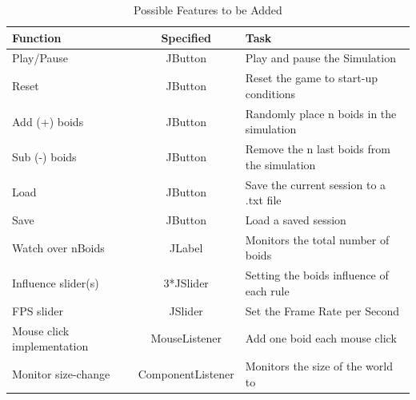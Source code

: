 \documentclass[a4paper,twoside, 10pt]{report}
\begin{document}
\begin{table}[h]
\centering
  \begin{tabular}{l|c|l}
    Function 		& Specified & Task	\\\hline
    Play/Pause 		& JButton & Play and pause the Simulation	\\
    Reset 			& JButton & Reset the game to start-up conditions		\\
    Add (+) boids 	& JButton & Randomly place n boids in the simulation	\\
    Sub (-) boids 	& JButton & Remove the n last boids from the simulation 	\\
    Load 			& JButton & Save the current session to a .txt file		\\
    Save 			& JButton & Load a saved session						\\
    Watch over nBoids & JLabel & Monitors the total number of boids			\\
    Influence slider(s)	 & 3*JSlider & Setting the boids influence of each rule	\\
    FPS slider 		& JSlider 		& Set the Frame Rate per Second			\\
    Mouse click implementation  	& MouseListener & Add  one boid each mouse click	\\
    Monitor size-change & ComponentListener & Monitors the size of the world to	\\
  \end{tabular}
  \caption{Possible Features to be Added}
  \label{tab:features}
\end{table}
\end{document}
